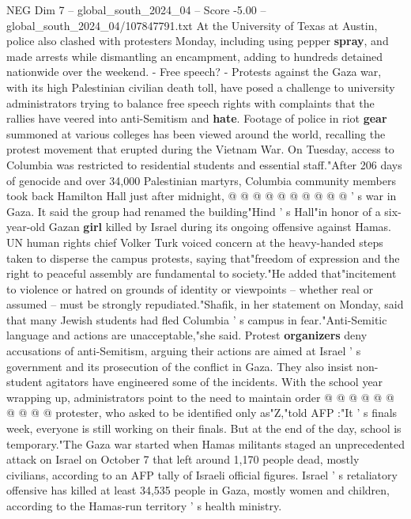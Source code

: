 \begin{textsample}{NEG Dim 7 – global\_south\_2024\_04 – Score -5.00 – global\_south\_2024\_04/107847791.txt}
At the University of Texas at Austin, police also clashed with protesters Monday, including using pepper \textbf{spray}, and made arrests while dismantling an encampment, adding to hundreds detained nationwide over the weekend. - Free speech? - Protests against the Gaza war, with its high Palestinian civilian death toll, have posed a challenge to university administrators trying to balance free speech rights with complaints that the rallies have veered into anti-Semitism and \textbf{hate}.
Footage of police in riot \textbf{gear} summoned at various colleges has been viewed around the world, recalling the protest movement that erupted during the Vietnam War.
On Tuesday, access to Columbia was restricted to residential students and essential staff."After 206 days of genocide and over 34,000 Palestinian martyrs, Columbia community members took back Hamilton Hall just after midnight, @ @ @ @ @ @ @ @ @ @ ' s war in Gaza.
It said the group had renamed the building"Hind ' s Hall"in honor of a six-year-old Gazan \textbf{girl} killed by Israel during its ongoing offensive against Hamas.
UN human rights chief Volker Turk voiced concern at the heavy-handed steps taken to disperse the campus protests, saying that"freedom of expression and the right to peaceful assembly are fundamental to society."He added that"incitement to violence or hatred on grounds of identity or viewpoints -- whether real or assumed -- must be strongly repudiated."Shafik, in her statement on Monday, said that many Jewish students had fled Columbia ' s campus in fear."Anti-Semitic language and actions are unacceptable,"she said.
Protest \textbf{organizers} deny accusations of anti-Semitism, arguing their actions are aimed at Israel ' s government and its prosecution of the conflict in Gaza.
They also insist non-student agitators have engineered some of the incidents.
With the school year wrapping up, administrators point to the need to maintain order @ @ @ @ @ @ @ @ @ @ protester, who asked to be identified only as"Z,"told AFP :"It ' s finals week, everyone is still working on their finals.
But at the end of the day, school is temporary."The Gaza war started when Hamas militants staged an unprecedented attack on Israel on October 7 that left around 1,170 people dead, mostly civilians, according to an AFP tally of Israeli official figures.
Israel ' s retaliatory offensive has killed at least 34,535 people in Gaza, mostly women and children, according to the Hamas-run territory ' s health ministry.

\end{textsample}
